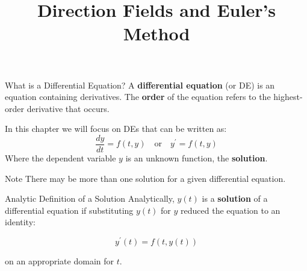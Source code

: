 \documentclass{beamer}
\title[MATH 1220 - Section 9.2]{Direction Fields and Euler's Method}
\begin{document}
\begin{frame}
\titlepage
\end{frame}

\begin{frame}
\begin{block}{What is a Differential Equation?}
A \textbf{differential equation} (or DE) is an equation containing derivatives. The \textbf{order} of the equation refers to the highest-order derivative that occurs.\pause

\vspace{2mm}
In this chapter we will focus on DEs that can be written as:
\begin{equation*}
\dfrac{dy}{dt}=f(t,y)
\quad\text{or}\quad
y^{\prime}=f(t,y)
\end{equation*}
Where the dependent variable $y$ is an unknown function, the \textbf{solution}.
\end{block}\pause

\begin{block}{Note}
There may be more than one solution for a given differential equation.
\end{block}\pause

\begin{block}{Analytic Definition of a Solution}
Analytically, $y(t)$ is a \textbf{solution} of a differential equation if substituting $y(t)$ for $y$ reduced the equation to an identity:

\vspace{-4mm}
\begin{equation*}
y^{\prime}(t)=f(t, y(t))
\end{equation*}

\vspace{-2mm}
on an appropriate domain for $t$.
\end{block}
\end{frame}
\end{document}
